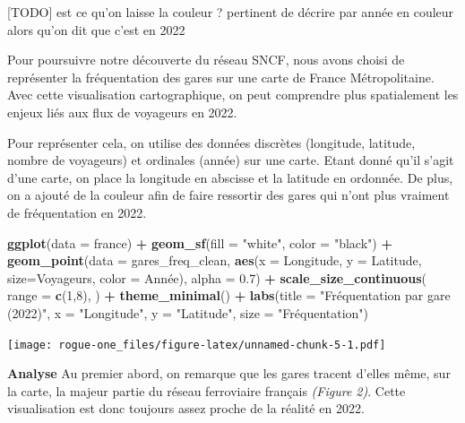 \documentclass[
]{article}
\newenvironment{Shaded}{\begin{snugshade}}{\end{snugshade}}
\newcommand{\AttributeTok}[1]{\textcolor[rgb]{0.13,0.29,0.53}{#1}}
\newcommand{\DecValTok}[1]{\textcolor[rgb]{0.00,0.00,0.81}{#1}}
\newcommand{\FloatTok}[1]{\textcolor[rgb]{0.00,0.00,0.81}{#1}}
\newcommand{\FunctionTok}[1]{\textcolor[rgb]{0.13,0.29,0.53}{\textbf{#1}}}
\newcommand{\NormalTok}[1]{#1}
\newcommand{\SpecialCharTok}[1]{\textcolor[rgb]{0.81,0.36,0.00}{\textbf{#1}}}
\newcommand{\StringTok}[1]{\textcolor[rgb]{0.31,0.60,0.02}{#1}}
\begin{document}
{[}TODO{]} est ce qu'on laisse la couleur ? pertinent de décrire par
année en couleur alors qu'on dit que c'est en 2022

Pour poursuivre notre découverte du réseau SNCF, nous avons choisi de
représenter la fréquentation des gares sur une carte de France
Métropolitaine. Avec cette visualisation cartographique, on peut
comprendre plus spatialement les enjeux liés aux flux de voyageurs en
2022.

Pour représenter cela, on utilise des données discrètes (longitude,
latitude, nombre de voyageurs) et ordinales (année) sur une carte. Etant
donné qu'il s'agit d'une carte, on place la longitude en abscisse et la
latitude en ordonnée. De plus, on a ajouté de la couleur afin de faire
ressortir des gares qui n'ont plus vraiment de fréquentation en 2022.

\begin{Shaded}
\begin{Highlighting}[]
\FunctionTok{ggplot}\NormalTok{(}\AttributeTok{data =}\NormalTok{ france) }\SpecialCharTok{+}
  \FunctionTok{geom\_sf}\NormalTok{(}\AttributeTok{fill =} \StringTok{"white"}\NormalTok{, }\AttributeTok{color =} \StringTok{"black"}\NormalTok{) }\SpecialCharTok{+}
  \FunctionTok{geom\_point}\NormalTok{(}\AttributeTok{data =}\NormalTok{ gares\_freq\_clean, }\FunctionTok{aes}\NormalTok{(}\AttributeTok{x =}\NormalTok{ Longitude, }\AttributeTok{y =}\NormalTok{ Latitude, }\AttributeTok{size=}\NormalTok{Voyageurs, }\AttributeTok{color =}\NormalTok{ Année), }\AttributeTok{alpha =} \FloatTok{0.7}\NormalTok{) }\SpecialCharTok{+}
  \FunctionTok{scale\_size\_continuous}\NormalTok{(}
    \AttributeTok{range =} \FunctionTok{c}\NormalTok{(}\DecValTok{1}\NormalTok{,}\DecValTok{8}\NormalTok{), }
\NormalTok{  ) }\SpecialCharTok{+}
  \FunctionTok{theme\_minimal}\NormalTok{() }\SpecialCharTok{+}
  \FunctionTok{labs}\NormalTok{(}\AttributeTok{title =} \StringTok{"Fréquentation par gare (2022)"}\NormalTok{,}
       \AttributeTok{x =} \StringTok{"Longitude"}\NormalTok{,}
       \AttributeTok{y =} \StringTok{"Latitude"}\NormalTok{,}
       \AttributeTok{size =} \StringTok{"Fréquentation"}\NormalTok{)}
\end{Highlighting}
\end{Shaded}

\texttt{[image: rogue-one\_files/figure-latex/unnamed-chunk-5-1.pdf]}

\textbf{Analyse} Au premier abord, on remarque que les gares tracent
d'elles même, sur la carte, la majeur partie du réseau ferroviaire
français \emph{(Figure 2)}. Cette visualisation est donc toujours assez
proche de la réalité en 2022.
\end{document}
